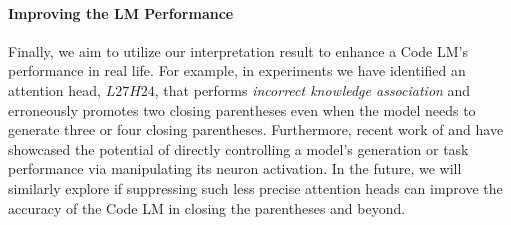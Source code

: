 {\paragraph{Improving the LM Performance}
Finally, we aim to utilize our interpretation result to enhance a Code LM's performance in real life.
For example, in experiments we have identified an attention head, $L27H24$, that performs \emph{incorrect knowledge association} and erroneously promotes two closing parentheses even when the model needs to generate three or four closing parentheses. Furthermore, recent work of \citet{geva2022transformer} and \citet{rai2024investigation} have showcased the potential of directly controlling a model's generation or task performance via manipulating its neuron activation. In the future, we will similarly explore if suppressing such less precise attention heads can improve the accuracy of the Code LM in closing the parentheses and beyond.
}